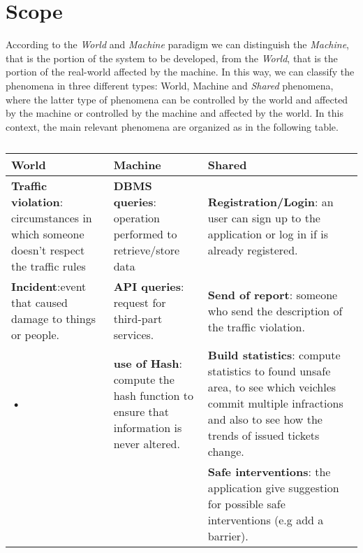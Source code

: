 \documentclass{report}
\begin{document}
\section{Scope}
According to the \textit{World} and \textit{Machine} paradigm we can distinguish the \textit{Machine}, that is the portion of the system to be developed, from the \textit{World}, that is the portion of the real-world affected by the machine. In this way, we can classify the phenomena in three different types: World, Machine and \textit{Shared} phenomena, where the latter type of phenomena can be controlled by the world and affected by the machine or controlled by the machine and affected by the world.
\newline
In this context, the main relevant phenomena are organized as in the following table.
\begin{table}[h!]
		\begin{center}
			\begin{tabular}{|C{3.5cm}|C{3.5cm}|C{3.5cm}|}
				\toprule
				\textbf{World} &\textbf{Machine}& \textbf{Shared}\\
				\midrule
				\textbf{Traffic violation}: circumstances in which someone doesn't respect the traffic rules&\textbf{DBMS queries}: operation performed to retrieve/store data&\textbf{Registration/Login}: an user can sign up to the application or log in if is already registered.\\
				\midrule
				\textbf{Incident}:event that caused damage to things or people.&\textbf{API queries}: request for third-part services.&\textbf{Send of report}: someone who send the description of the traffic violation.\\
				\midrule
				\textbf{•}&\textbf{use of Hash}: compute the hash function to ensure that information is never altered. &\textbf{Build statistics}: compute statistics to found unsafe area, to see which veichles commit multiple infractions and also to see how the trends of issued tickets change.\\
				\midrule
				&&\textbf{Safe interventions}: the application give suggestion for possible safe interventions (e.g add a barrier). \\ 
			\end{tabular}
		\end{center}
		\caption{}
		\label{tab:multicol}
	\end{table}
  
\end{document}
